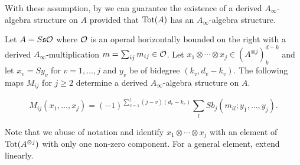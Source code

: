 \documentclass[Thesis.tex]{subfiles}
\begin{document}
With these assumption, by  we can guarantee the existence of a derived $A_\infty$-algebra structure on $A$ provided that $\operatorname{Tot}(A)$ has an $A_\infty$-algebra structure.




\begin{thm}\label{derivedmaps}
Let $A=S\mathfrak{s}{\mathcal O}$ where ${\mathcal O}$ is an operad horizontally bounded on the right with a derived $A_\infty$-multiplication $m=\sum_{ij}m_{ij}\in{\mathcal O}$. Let $x_1\otimes\cdots\otimes x_j\in (A^{\otimes j})^{d-k}_k$ and let $x_v = Sy_v$ for $v=1,\dots, j$ and $y_v$ be of bidegree $(k_v,d_v-k_v)$. The following maps $M_{ij}$ for $j\geq 2$ determine a derived $A_\infty$-algebra structure on $A$.


\[M_{ij}(x_1,\dots,x_j)= (-1)^{\sum_{v=1}^j(j-v)(d_v-k_v)}\sum_lSb_j(m_{il};y_1,\dots, y_j). \]
\end{thm}
Note that we abuse of notation and identify $x_1\otimes\cdots\otimes x_j$ with an element of $\operatorname{Tot}(A^{\otimes j})$ with only one non-zero component. For a general element, extend linearly.
\end{document}
